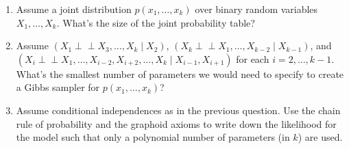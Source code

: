 \documentclass[11pt]{article}
\begin{document}
\begin{enumerate}
\item Assume a joint distribution $p(x_1, \ldots, x_k)$ over binary random variables $X_1, \ldots, X_k$.
What's the size of the joint probability table?\\
\begin{answertext}{3cm}{}
\end{answertext}

\item Assume $(X_1 {\perp\!\!\!\perp} X_3, \ldots, X_k \mid X_2)$, $(X_k {\perp\!\!\!\perp} X_1, \ldots, X_{k-2} \mid X_{k-1})$, and $(X_i {\perp\!\!\!\perp} X_1, \ldots, X_{i-2}, X_{i+2}, \ldots, X_k \mid X_{i-1}, X_{i+1})$ for each $i = 2, \ldots, k-1$.  What's the smallest number of parameters we would need to specify to create a Gibbs sampler for $p(x_1, \ldots, x_k)$?\\
\begin{answertext}{6cm}{}
\end{answertext}

\item Assume conditional independences as in the previous question.  Use the chain rule of probability and the graphoid axioms to write down the likelihood for the model such that only a polynomial number of parameters (in $k$) are used.\\
\begin{answertext}{6cm}{}

\end{answertext} 
\end{enumerate}
\end{document}
